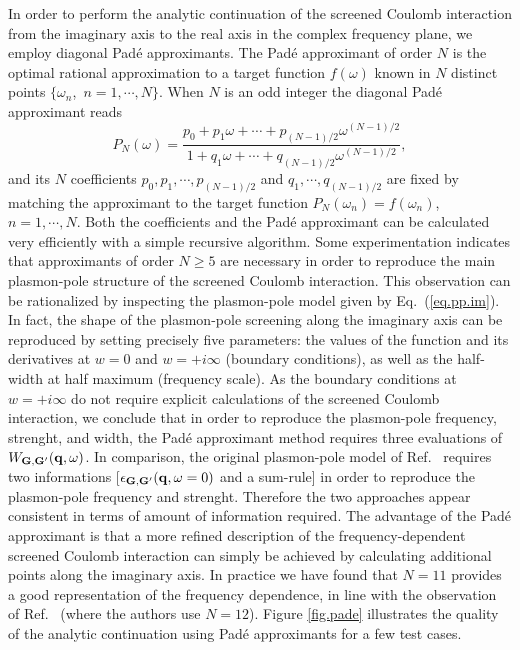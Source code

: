 \documentclass[twocolumn,prb,showpacs,superscriptaddress]{revtex4}
\def\w{\omega}
\def\q{{\bf q}}
\def\G{{\bf G}}
\def\Gp{{\bf G^\prime}}
\begin{document}
In order to perform the analytic continuation of the screened Coulomb interaction
from the imaginary axis to the real axis in the complex frequency plane, we employ diagonal 
Pad\'e approximants.\cite{pade1,pade2,pade3}
The Pad\'e approximant of order $N$ is the optimal rational approximation
to a target function $f(\w)$ known in $N$ distinct points 
$\{\w_n$,~$n=1,\cdots,N\}$. 
When $N$ is an odd integer the diagonal Pad\'e approximant reads
  \begin{equation}
  P_N(\w) = \frac{p_0+p_1\w+\cdots+p_{(N-1)/2}\w^{(N-1)/2}}
  {1+q_1\w+\cdots+q_{(N-1)/2}\w^{(N-1)/2}},
  \end{equation}
and its $N$ coefficients $p_0, p_1, \cdots, p_{(N-1)/2}$ and 
$q_1, \cdots, q_{(N-1)/2}$ are fixed by matching the approximant
to the target function $P_N(\w_n)=f(\w_n)$,~$n=1,\cdots,N$.
Both the coefficients and the Pad\'e approximant can be calculated
very efficiently with a simple recursive algorithm.\cite{pade2}
Some experimentation indicates that approximants of order $N\ge5$ are necessary
in order to reproduce the main plasmon-pole structure of the screened 
Coulomb interaction.
This observation can be rationalized by inspecting the plasmon-pole
model given by Eq.\ (\ref{eq.pp.im}). In fact, the shape of the plasmon-pole
screening along the imaginary axis can be reproduced by setting precisely
five parameters: the values of the function and its derivatives at $w=0$ and $w=+i\infty$
(boundary conditions), as well as the half-width at half maximum (frequency scale).
As the boundary conditions at $w=+i\infty$ do not require explicit calculations
of the screened Coulomb interaction, we conclude that in order to reproduce
the plasmon-pole frequency, strenght, and width, the Pad\'e approximant
method requires three evaluations of $W_{\G,\Gp}(\q,\w)$. In comparison, the original
plasmon-pole model of Ref.\  requires two informations
[$\epsilon_{\G,\Gp}(\q,\w=0)$ and a sum-rule] in order to reproduce the plasmon-pole 
frequency and strenght. Therefore the two approaches appear consistent
in terms of amount of information required.
The advantage of the Pad\'e approximant is that a more refined description
of the frequency-dependent screened Coulomb interaction can simply be achieved
by calculating additional points along the imaginary axis. In practice
we have found that $N=11$ provides a good representation of the frequency
dependence, in line with the observation of Ref.\ 
(where the authors use $N=12$). Figure \ref{fig.pade} illustrates the quality
of the analytic continuation using Pad\'e approximants for a few test cases.
\end{document}
